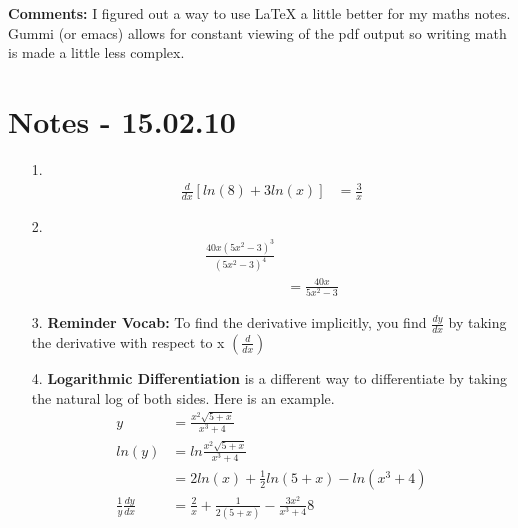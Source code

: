 \documentclass[11pt]{article}
\begin{document}
{\bf Comments:} I figured out a way to use LaTeX a little better for my maths notes.  Gummi (or emacs) allows for constant viewing of the pdf output so writing math is made a little less complex.

\section{Notes - 15.02.10}
\begin{itemize}
\item[1.]
	\begin{align*}
		\frac{d}{dx} \left[ln(8)+3ln(x)\right] &= \frac{3}{x}
	\end{align*}
\item[2.]
	\begin{align*}
		\frac{40x(5x^2-3)^3}{(5x^2-3)^4} \\
		&=\frac{40x}{5x^2-3}
	\end{align*}
\item[3.] {\bf Reminder Vocab:} To find the derivative implicitly, you find $\frac{dy}{dx}$ by taking the derivative with respect to x $\left( \frac{d}{dx} \right)$

\item[4.] {\bf Logarithmic Differentiation} is a different way to differentiate by taking the natural log of both sides.  Here is an example.
	\begin{align*}
	y &= \frac{x^2 \sqrt{5 + x}}{x^3+4}\\
	ln(y) &= ln \frac{x^2\sqrt{5 + x}}{x^3+4}\\
	&= 2ln(x) + \frac{1}{2}ln\left(5+x\right)-ln\left(x^3+4\right)\\
	\frac{1}{y}\frac{dy}{dx} &= \frac{2}{x}+\frac{1}{2(5+x)}-\frac{3x^2}{x^3+4}8
	\end{align*}
\end{itemize}
\end{document}
